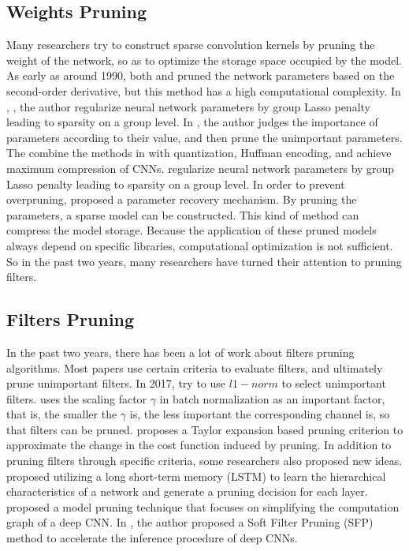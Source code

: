 \documentclass[runningheads]{llncs}
\begin{document}
\subsection{Weights Pruning}
Many researchers try to construct sparse convolution kernels by pruning the weight of the network, so as to optimize the storage space occupied by the model. As early as around 1990, both \cite{b15} and \cite{b23} pruned the network parameters based on the second-order derivative, but this method has a high computational complexity.  In \cite{b12}, \cite{b16}, the author regularize neural network parameters by group Lasso penalty leading to sparsity on a group level. In \cite{b9}, the author judges the importance of parameters according to their value, and then prune the unimportant parameters. The \cite{b10} combine the methods in \cite{b9} with quantization, Huffman encoding, and achieve maximum compression of CNNs. \cite{b14} regularize neural network parameters by
group Lasso penalty leading to sparsity on a group level. In order to prevent overpruning, \cite{b11} proposed a parameter recovery mechanism.
By pruning the parameters, a sparse model can be constructed. This kind of method can compress the model storage. Because the application of these pruned models always depend on specific libraries, computational optimization is not sufficient. So in the past two years, many researchers have turned their attention to pruning filters.

\subsection{Filters Pruning}
In the past two years, there has been a lot of work about filters pruning algorithms. Most papers use certain criteria to evaluate filters, and ultimately prune unimportant filters. In 2017, \cite{b17}  try to use $l1-norm$ to select unimportant filters. \cite{b18} uses the scaling factor $\gamma$ in batch normalization as an important factor, that is, the smaller the $\gamma$ is, the less important the corresponding channel is, so that filters can be pruned. \cite{b21} proposes a Taylor expansion based pruning criterion to approximate the change in the cost function induced by pruning.
In addition to pruning filters through specific criteria, some researchers also proposed new ideas. \cite{b28} proposed utilizing a long short-term memory (LSTM) to learn the hierarchical characteristics of a network and generate a pruning decision for each layer. \cite{b29} proposed a model pruning technique that focuses on simplifying the computation graph of a deep CNN. In \cite{b27}, the author proposed a Soft Filter Pruning (SFP) method to accelerate the inference procedure of deep CNNs.
\end{document}
